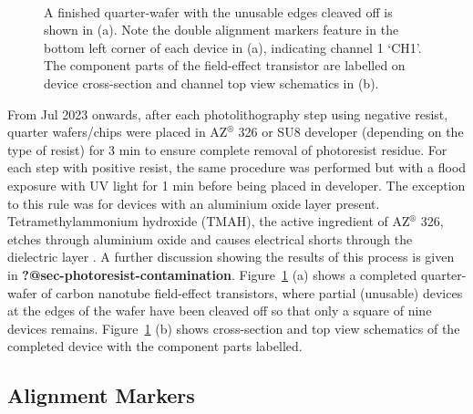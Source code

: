 \documentclass[
  a4paper,
]{scrbook}
\begin{document}
\begin{figure}
\begin{minipage}[t]{0.45\linewidth}
{{}

}

\end{minipage}%
%
\begin{minipage}[t]{0.01\linewidth}

{\centering 

~

}

\end{minipage}%

\caption{\label{fig-field-effect-transistor}A finished quarter-wafer
with the unusable edges cleaved off is shown in (a). Note the double
alignment markers feature in the bottom left corner of each device in
(a), indicating channel 1 `CH1'. The component parts of the field-effect
transistor are labelled on device cross-section and channel top view
schematics in (b).}

\end{figure}

From Jul 2023 onwards, after each photolithography step using negative
resist, quarter wafers/chips were placed in AZ\(^\circledR\) 326 or SU8
developer (depending on the type of resist) for 3 min to ensure complete
removal of photoresist residue. For each step with positive resist, the
same procedure was performed but with a flood exposure with UV light for
1 min before being placed in developer. The exception to this rule was
for devices with an aluminium oxide layer present. Tetramethylammonium
hydroxide (TMAH), the active ingredient of AZ\(^\circledR\) 326, etches
through aluminium oxide and causes electrical shorts through the
dielectric layer \autocite{Oh2011,Ali2021}. A further discussion showing
the results of this process is given in
\textbf{?@sec-photoresist-contamination}.
Figure~\ref{fig-field-effect-transistor} (a) shows a completed
quarter-wafer of carbon nanotube field-effect transistors, where partial
(unusable) devices at the edges of the wafer have been cleaved off so
that only a square of nine devices remains.
Figure~\ref{fig-field-effect-transistor} (b) shows cross-section and top
view schematics of the completed device with the component parts
labelled.

\hypertarget{sec-align}{%
\subsection{Alignment Markers}\label{sec-align}}
\end{document}
